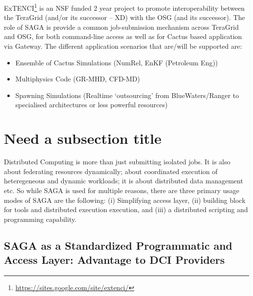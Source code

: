 \documentclass[10pt,conference,final,letterpaper,twoside,twocolumn,]{IEEEtran}
\begin{document}
 ExTENCI\footnote{\url{https://sites.google.com/site/extenci/}} is an
 NSF funded 2 year project to promote interoperability between the
 TeraGrid (and/or its successor -- XD) with the OSG (and its
 successor).  The role of SAGA is provide a common job-submission
 mechanism across TeraGrid and OSG, for both command-line access as
 well as for Cactus based application via Gateway.  The different
 application scenarios that are/will be supported are:
 
 \begin{itemize}
 \item Ensemble of Cactus Simulations (NumRel, EnKF (Petroleum Eng))
 \item Multiphysics Code (GR-MHD, CFD-MD)
 \item Spawning Simulations (Realtime ‘outsourcing’ from
   BlueWaters/Ranger to specialised architectures or less powerful
   resources)
 \end{itemize}



\section{Need a subsection title}

Distributed Computing is more than just submitting isolated jobs.  It
is also about federating resources dynamically; about coordinated
execution of heteregeneous and dynamic workloads; it is about
distributed data management etc. So while SAGA is used for multiple
reasons, there are three primary usage modes of SAGA are the
following: (i) Simplifying access layer, (ii) building block for tools
and distributed execution execution, and (iii) a distributed scripting
and programming capability.


\subsection{SAGA as a Standardized Programmatic and Access Layer:
  Advantage to DCI Providers}
\end{document}
